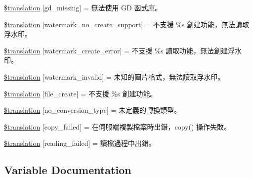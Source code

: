 \begin{DoxyCompactItemize}
\item 
\hyperlink{class_8upload_8zh___t_w_8php_a7f3dfcc0db4bbc0f2e7210c439798e56}{\$translation} \mbox{[}\textquotesingle{}gd\+\_\+missing\textquotesingle{}\mbox{]} = \textquotesingle{}無法使用 G\+D 函式庫。\textquotesingle{}
\item 
\hyperlink{class_8upload_8zh___t_w_8php_a82d5853430ab72dc1f9799ec36144cc6}{\$translation} \mbox{[}\textquotesingle{}watermark\+\_\+no\+\_\+create\+\_\+support\textquotesingle{}\mbox{]} = \textquotesingle{}不支援 \%s 創建功能，無法讀取浮水印。\textquotesingle{}
\item 
\hyperlink{class_8upload_8zh___t_w_8php_aabca0b65dadbc6184415c16375f284ca}{\$translation} \mbox{[}\textquotesingle{}watermark\+\_\+create\+\_\+error\textquotesingle{}\mbox{]} = \textquotesingle{}不支援 \%s 讀取功能，無法創建浮水印。\textquotesingle{}
\item 
\hyperlink{class_8upload_8zh___t_w_8php_ac336e7a5701e47ba4a05e9e498a3cc44}{\$translation} \mbox{[}\textquotesingle{}watermark\+\_\+invalid\textquotesingle{}\mbox{]} = \textquotesingle{}未知的圖片格式，無法讀取浮水印。\textquotesingle{}
\item 
\hyperlink{class_8upload_8zh___t_w_8php_a1ecb4673e4fb69e06b3f20b65cecf30a}{\$translation} \mbox{[}\textquotesingle{}file\+\_\+create\textquotesingle{}\mbox{]} = \textquotesingle{}不支援 \%s 創建功能。\textquotesingle{}
\item 
\hyperlink{class_8upload_8zh___t_w_8php_a4712d7ec28e9a7f17eb3338af2358363}{\$translation} \mbox{[}\textquotesingle{}no\+\_\+conversion\+\_\+type\textquotesingle{}\mbox{]} = \textquotesingle{}未定義的轉換類型。\textquotesingle{}
\item 
\hyperlink{class_8upload_8zh___t_w_8php_a783c9358bcf54a054545b50098bc679b}{\$translation} \mbox{[}\textquotesingle{}copy\+\_\+failed\textquotesingle{}\mbox{]} = \textquotesingle{}在伺服端複製檔案時出錯，copy() 操作失敗。\textquotesingle{}
\item 
\hyperlink{class_8upload_8zh___t_w_8php_a01bea14c9fd5f353f62db44beabfcd42}{\$translation} \mbox{[}\textquotesingle{}reading\+\_\+failed\textquotesingle{}\mbox{]} = \textquotesingle{}讀檔過程中出錯。\textquotesingle{}
\end{DoxyCompactItemize}


\subsection{Variable Documentation}
\hypertarget{class_8upload_8zh___t_w_8php_a1f198d410fecc3871ebdd468d343a5e3}{}
